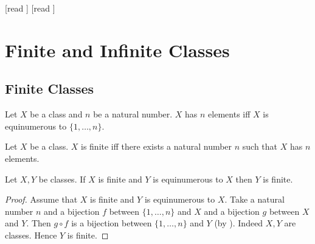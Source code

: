 \documentclass[10pt]{article}
\begin{document}
  \begin{imports}
    \begin{forthel}
      [read ]
      [read ]
    \end{forthel}
  \end{imports}


  \section*{Finite and Infinite Classes}

  \subsection*{Finite Classes}

  \begin{forthel}
    \begin{definition}[id=FOUNDATIONS_14_3512046897512410,printid]
      Let $X$ be a class and $n$ be a natural number.
      $X$ has $n$ elements iff $X$ is equinumerous to $\{ 1, \dots, n \}$.
    \end{definition}
  \end{forthel}

  \begin{forthel}
    \begin{definition}[id=FOUNDATIONS_14_3694156977274880,printid]
      Let $X$ be a class.
      $X$ is finite iff there exists a natural number $n$ such that $X$ has $n$ elements.
    \end{definition}
  \end{forthel}

  \begin{forthel}
    \begin{proposition}[id=FOUNDATIONS_14_3929085203972096,printid]
      Let $X, Y$ be classes.
      If $X$ is finite and $Y$ is equinumerous to $X$ then $Y$ is finite.
    \end{proposition}
    \begin{proof}
      Assume that $X$ is finite and $Y$ is equinumerous to $X$.
      Take a natural number $n$ and a bijection $f$ between $\{ 1, \dots, n \}$ and $X$ and a bijection $g$ between $X$ and $Y$.
      Then $g \circ f$ is a bijection between $\{ 1, \dots, n \}$ and $Y$ (by ).
      Indeed $X, Y$ are classes.
      Hence $Y$ is finite.
    \end{proof}
  \end{forthel}
\end{document}
